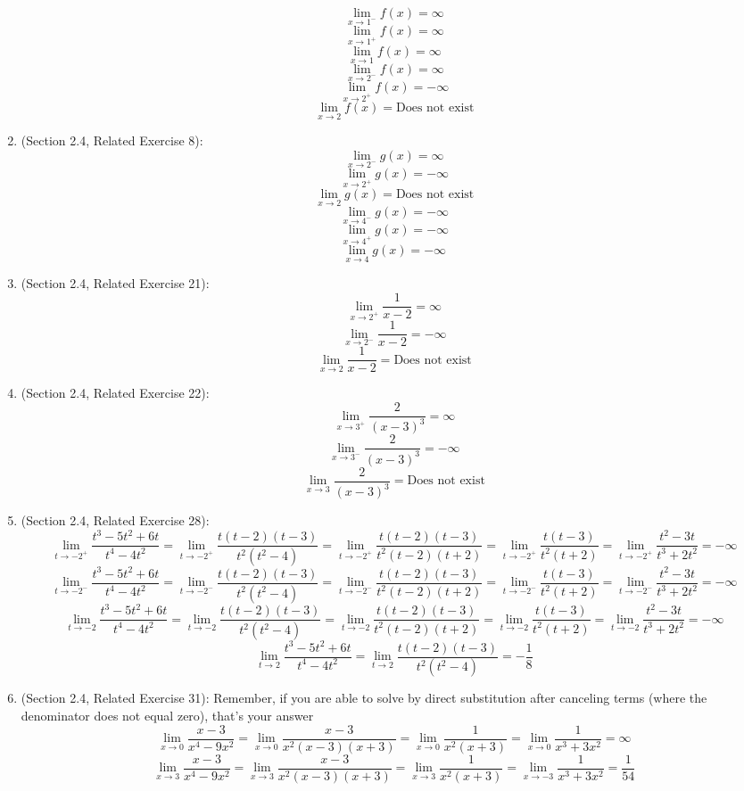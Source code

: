 \documentclass{article}
\begin{document}
\begin{enumerate}
		$$\lim_{x \to 1^-}{f(x)} = \infty$$
		$$\lim_{x \to 1^+}{f(x)} = \infty$$
		$$\lim_{x \to 1}{f(x)} = \infty$$
		$$\lim_{x \to 2^-}{f(x)} = \infty$$
		$$\lim_{x \to 2^+}{f(x)} = - \infty$$
		$$\lim_{x \to 2}{f(x)} = \text{Does not exist}$$
	\item (Section 2.4, Related Exercise 8):
		$$\lim_{x \to 2^-}{g(x)} = \infty$$
		$$\lim_{x \to 2^+}{g(x)} = - \infty$$
		$$\lim_{x \to 2}{g(x)} = \text{Does not exist}$$
		$$\lim_{x \to 4^-}{g(x)} = - \infty$$
		$$\lim_{x \to 4^+}{g(x)} = - \infty$$
		$$\lim_{x \to 4}{g(x)} = - \infty$$
	\item (Section 2.4, Related Exercise 21):
		$$\lim_{x \to 2^+}{\frac{1}{x-2}} = \infty$$
		$$\lim_{x \to 2^-}{\frac{1}{x-2}} = - \infty$$
		$$\lim_{x \to 2}{\frac{1}{x-2}} = \text{Does not exist}$$
	\item (Section 2.4, Related Exercise 22):
		$$\lim_{x \to 3^+}{\frac{2}{(x - 3)^3}} = \infty$$
		$$\lim_{x \to 3^-}{\frac{2}{(x - 3)^3}} = - \infty$$
		$$\lim_{x \to 3}{\frac{2}{(x - 3)^3}} = \text{Does not exist}$$
	\item (Section 2.4, Related Exercise 28):
		$$\lim_{t \to -2^+}{\frac{t^3 - 5t^2 + 6t}{t^4 - 4t^2}} = \lim_{t \to -2^+}{\frac{t(t-2)(t-3)}{t^2(t^2 - 4)}} = \lim_{t \to -2^+}{\frac{t(t-2)(t-3)}{t^2(t-2)(t+2)}} = \lim_{t \to -2^+}{\frac{t(t-3)}{t^2(t+2)}} = \lim_{t \to -2^+}{\frac{t^2 - 3t}{t^3 + 2t^2}} = - \infty$$
		$$\lim_{t \to -2^-}{\frac{t^3 - 5t^2 + 6t}{t^4 - 4t^2}} = \lim_{t \to -2^-}{\frac{t(t-2)(t-3)}{t^2(t^2 - 4)}} = \lim_{t \to -2^-}{\frac{t(t-2)(t-3)}{t^2(t-2)(t+2)}} = \lim_{t \to -2^-}{\frac{t(t-3)}{t^2(t+2)}} = \lim_{t \to -2^-}{\frac{t^2 - 3t}{t^3 + 2t^2}} = - \infty$$
		$$\lim_{t \to -2}{\frac{t^3 - 5t^2 + 6t}{t^4 - 4t^2}} = \lim_{t \to -2}{\frac{t(t-2)(t-3)}{t^2(t^2 - 4)}} = \lim_{t \to -2}{\frac{t(t-2)(t-3)}{t^2(t-2)(t+2)}} = \lim_{t \to -2}{\frac{t(t-3)}{t^2(t+2)}} = \lim_{t \to -2}{\frac{t^2 - 3t}{t^3 + 2t^2}} = - \infty$$
		$$\lim_{t \to 2}{\frac{t^3 - 5t^2 + 6t}{t^4 - 4t^2}} = \lim_{t \to 2}{\frac{t(t-2)(t-3)}{t^2(t^2 - 4)}} = - \frac{1}{8}$$
	\item (Section 2.4, Related Exercise 31): Remember, if you are able to solve by direct substitution after canceling terms (where the denominator does not equal zero), that's your answer
		$$\lim_{x \to 0}{\frac{x - 3}{x^4 - 9x^2}} = \lim_{x \to 0}{\frac{x - 3}{x^2(x-3)(x+3)}} = \lim_{x \to 0}{\frac{1}{x^2(x+3)}} = \lim_{x \to 0}{\frac{1}{x^3+3x^2}} = \infty$$
		$$\lim_{x \to 3}{\frac{x - 3}{x^4 - 9x^2}} = \lim_{x \to 3}{\frac{x - 3}{x^2(x-3)(x+3)}} = \lim_{x \to 3}{\frac{1}{x^2(x+3)}} = \lim_{x \to -3}{\frac{1}{x^3+3x^2}} = \frac{1}{54}$$

\end{enumerate}
\end{document}
